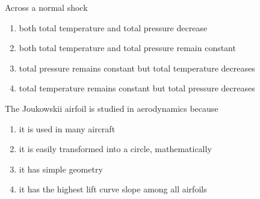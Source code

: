 \iffalse
\title{2007-AE- 18-34}
\author{EE24BTECH11016 - DHWANITH M DODDAHUNDI}
\section{ae}
\chapter{2007}
\fi

\item Across a normal shock
\begin{enumerate}
    \item both total temperature and total pressure decrease
    \item both total temperature and total pressure remain constant
    \item total pressure remains constant but total temperature decreases
    \item total temperature remains constant but total pressure decreases
\end{enumerate}

\item The Joukowskii airfoil is studied in aerodynamics because
\begin{enumerate}
    \item it is used in many aircraft
    \item it is easily transformed into a circle, mathematically
    \item it has simple geometry
    \item it has the highest lift curve slope among all airfoils
\end{enumerate}

